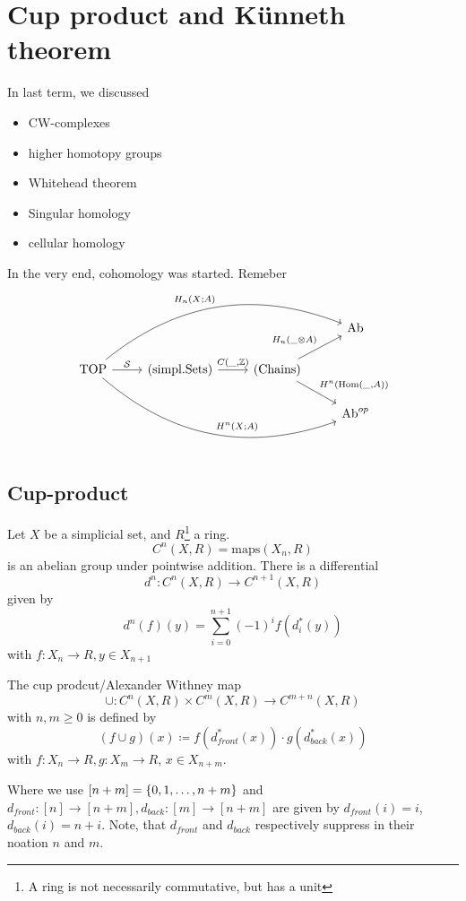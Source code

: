 \documentclass[language=english]{TemplateLecture}
\begin{document}
\setcounter{chapter}{0}
\part{Cup product and Künneth theorem}


In last term, we discussed
\begin{itemize}
    \item CW-complexes
    \item higher homotopy groups
    \item Whitehead theorem 
    \item Singular homology
    \item cellular homology
\end{itemize}

In the very end, cohomology was started. Remeber
\[\begin{tikzcd}
    & & & \mathrm{Ab} \\
    \mathrm{TOP} \ar[rrru, bend left, "H_n(X;A)"] \ar[rrrd, bend right, "H^n(X;A)"] \ar[r, "\cS"] & (\mathrm{simpl. Sets}) \ar[r, "{C(\_, \IZ)}"] & (\mathrm{Chains}) \ar[ru, "H_n(\_ \otimes A)"] \ar[rd, "{H^n(\Hom(\_, A))}"] & \\
    & & & \mathrm{Ab}^{op} \\
\end{tikzcd}\]

\chapter{Cup-product}


Let \(X\) be a simplicial set, and \(R\)\footnote{A ring is not necessarily commutative, but has a unit} a ring.
\[C^n(X, R) = \mathrm{maps}(X_n, R)\]
is an abelian group under pointwise addition. There is a differential
\[d^n\colon C^n(X,R) \to C^{n+1}(X,R)\]
given by
\[d^n(f)(y) = \sum_{i = 0}^{n+1}(-1)^{i} f(d_i^*(y))\]
with \(f\colon X_n \to R, y \in X_{n+1}\)


\begin{construction}
    The cup prodcut/Alexander Withney map
    \[\cup\colon C^n(X,R) \times C^m(X,R) \to C^{m+n}(X,R)\]
    with \(n,m \geq 0\) is defined by
    \[(f\cup g)(x)\coloneq f(d_{front}^*(x)) \cdot g(d_{back}^*(x))\]
    with \(f\colon X_n \to R, g\colon X_m \to R\), \(x \in X_{n+m}\).

    Where we use \([n+m] = \{0,1,\dots, n+m\}\) and \(d_{front} \colon [n] \to [n+m], d_{back}\colon [m]\to [n+m]\) are given by \(d_{front}(i) = i\), \(d_{back}(i) = n+i\). Note, that \(d_{front}\) and \(d_{back}\) respectively suppress in their noation \(n\) and \(m\).
\end{construction}
\end{document}

